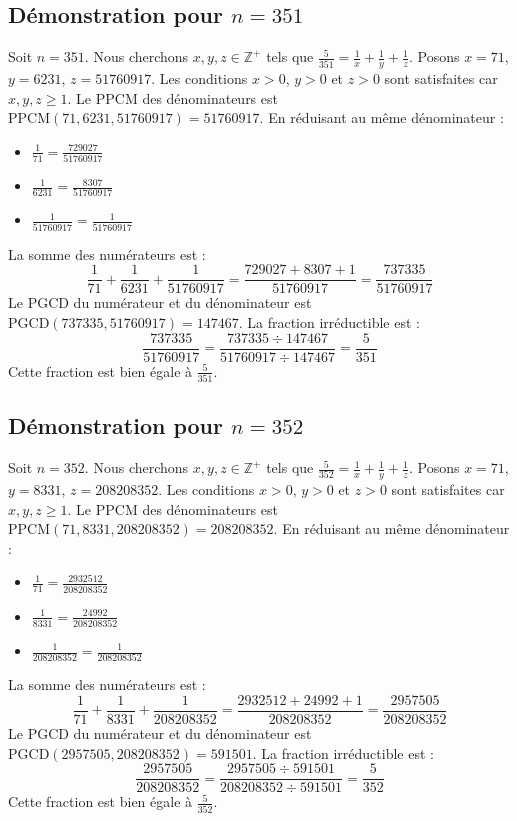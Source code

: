 \documentclass[11pt,a4paper]{article}
\begin{document}
\subsection{Démonstration pour $n = 351$}
Soit $n = 351$. Nous cherchons $x, y, z \in \mathbb{Z}^{+}$ tels que $\frac{5}{351} = \frac{1}{x} + \frac{1}{y} + \frac{1}{z}$.
Posons $x = 71$, $y = 6231$, $z = 51760917$.
Les conditions $x > 0$, $y > 0$ et $z > 0$ sont satisfaites car $x, y, z \geq 1$.
Le PPCM des dénominateurs est $\text{PPCM}(71, 6231, 51760917) = 51760917$.
En réduisant au même dénominateur :
\begin{itemize}
    \item $\frac{1}{71} = \frac{729027}{51760917}$
    \item $\frac{1}{6231} = \frac{8307}{51760917}$
    \item $\frac{1}{51760917} = \frac{1}{51760917}$
\end{itemize}
La somme des numérateurs est :
$$ \frac{1}{71} + \frac{1}{6231} + \frac{1}{51760917} = \frac{729027 + 8307 + 1}{51760917} = \frac{737335}{51760917} $$
Le PGCD du numérateur et du dénominateur est $\text{PGCD}(737335, 51760917) = 147467$.
La fraction irréductible est :
$$ \frac{737335}{51760917} = \frac{737335 \div 147467}{51760917 \div 147467} = \frac{5}{351} $$
Cette fraction est bien égale à $\frac{5}{351}$.

\subsection{Démonstration pour $n = 352$}
Soit $n = 352$. Nous cherchons $x, y, z \in \mathbb{Z}^{+}$ tels que $\frac{5}{352} = \frac{1}{x} + \frac{1}{y} + \frac{1}{z}$.
Posons $x = 71$, $y = 8331$, $z = 208208352$.
Les conditions $x > 0$, $y > 0$ et $z > 0$ sont satisfaites car $x, y, z \geq 1$.
Le PPCM des dénominateurs est $\text{PPCM}(71, 8331, 208208352) = 208208352$.
En réduisant au même dénominateur :
\begin{itemize}
    \item $\frac{1}{71} = \frac{2932512}{208208352}$
    \item $\frac{1}{8331} = \frac{24992}{208208352}$
    \item $\frac{1}{208208352} = \frac{1}{208208352}$
\end{itemize}
La somme des numérateurs est :
$$ \frac{1}{71} + \frac{1}{8331} + \frac{1}{208208352} = \frac{2932512 + 24992 + 1}{208208352} = \frac{2957505}{208208352} $$
Le PGCD du numérateur et du dénominateur est $\text{PGCD}(2957505, 208208352) = 591501$.
La fraction irréductible est :
$$ \frac{2957505}{208208352} = \frac{2957505 \div 591501}{208208352 \div 591501} = \frac{5}{352} $$
Cette fraction est bien égale à $\frac{5}{352}$.
\end{document}
